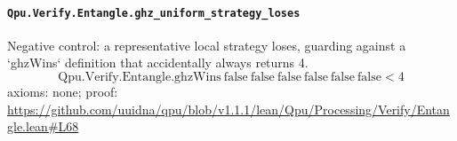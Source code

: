 \documentclass[11pt]{article}
\begin{document}
\paragraph{\texttt{Qpu.Verify.Entangle.ghz\_uniform\_strategy\_loses}}
Negative control: a representative local strategy loses, guarding against a `ghzWins` definition that accidentally always returns 4.
\[ \mathrm{Qpu.Verify.Entangle.ghzWins}\ \mathrm{false}\ \mathrm{false}\ \mathrm{false}\ \mathrm{false}\ \mathrm{false}\ \mathrm{false} < 4 \]
\noindent axioms: none; proof: \url{https://github.com/uuidna/qpu/blob/v1.1.1/lean/Qpu/Processing/Verify/Entangle.lean\#L68}
\end{document}
